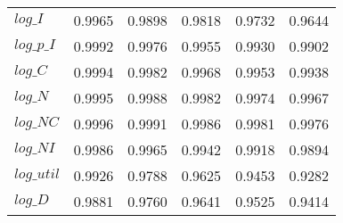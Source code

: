 \begin{center}
\begin{longtable}{lccccc}
$log\_I     $	 & 	    0.9965	 & 	    0.9898	 & 	    0.9818	 & 	    0.9732	 & 	    0.9644 \\ 
$log\_p\_I  $	 & 	    0.9992	 & 	    0.9976	 & 	    0.9955	 & 	    0.9930	 & 	    0.9902 \\ 
$log\_C     $	 & 	    0.9994	 & 	    0.9982	 & 	    0.9968	 & 	    0.9953	 & 	    0.9938 \\ 
$log\_N     $	 & 	    0.9995	 & 	    0.9988	 & 	    0.9982	 & 	    0.9974	 & 	    0.9967 \\ 
$log\_NC    $	 & 	    0.9996	 & 	    0.9991	 & 	    0.9986	 & 	    0.9981	 & 	    0.9976 \\ 
$log\_NI    $	 & 	    0.9986	 & 	    0.9965	 & 	    0.9942	 & 	    0.9918	 & 	    0.9894 \\ 
$log\_util  $	 & 	    0.9926	 & 	    0.9788	 & 	    0.9625	 & 	    0.9453	 & 	    0.9282 \\ 
$log\_D     $	 & 	    0.9881	 & 	    0.9760	 & 	    0.9641	 & 	    0.9525	 & 	    0.9414 \\ 
\end{longtable}
 \end{center}

